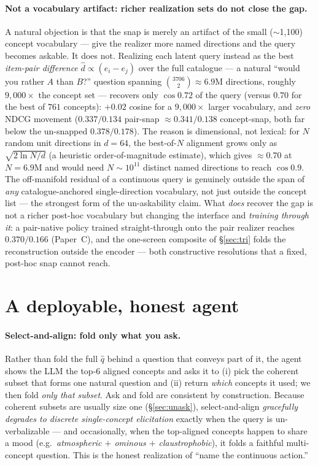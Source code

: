 \documentclass[11pt]{article}
\newcommand{\qhat}{\hat q}
\begin{document}
\paragraph{Not a vocabulary artifact: richer realization sets do not close the gap.} A natural objection is that the
snap is merely an artifact of the small ($\sim$1{,}100) concept vocabulary --- give the realizer more named directions
and the query becomes askable. It does not. Realizing each latent query instead as the best \emph{item-pair difference}
$\hat d\propto(e_i-e_j)$ over the full catalogue --- a natural ``would you rather $A$ than $B$?'' question spanning
$\binom{3706}{2}\approx 6.9\text{M}$ directions, roughly $9{,}000\times$ the concept set --- recovers only $\cos 0.72$
of the query (versus $0.70$ for the best of $761$ concepts): $+0.02$ cosine for a $9{,}000\times$ larger vocabulary, and
\emph{zero} NDCG movement ($0.337/0.134$ pair-snap $\approx 0.341/0.138$ concept-snap, both far below the un-snapped
$0.378/0.178$). The reason is dimensional, not lexical: for $N$ random unit directions in $d{=}64$, the best-of-$N$
alignment grows only as $\sqrt{2\ln N/d}$ (a heuristic order-of-magnitude estimate), which gives $\approx 0.70$ at
$N{=}6.9$M and would need $N\sim 10^{11}$ distinct named directions to reach $\cos 0.9$. The off-manifold residual of a
continuous query is genuinely outside the span of \emph{any} catalogue-anchored single-direction vocabulary, not just
outside the concept list --- the strongest form of the un-askability claim. What \emph{does} recover the gap is not a
richer post-hoc vocabulary but changing the interface and \emph{training through it}: a pair-native policy trained
straight-through onto the pair realizer reaches $0.370/0.166$ (Paper~C), and the one-screen composite of \S\ref{sec:tri}
folds the reconstruction outside the encoder --- both constructive resolutions that a fixed, post-hoc snap cannot reach.

\section{A deployable, honest agent}\label{sec:agent}
\paragraph{Select-and-align: fold only what you ask.} Rather than fold the full $\qhat$ behind a question that conveys
part of it, the agent shows the LLM the top-6 aligned concepts and asks it to (i) pick the coherent subset that forms
one natural question and (ii) return \emph{which} concepts it used; we then fold \emph{only that subset}. Ask and fold
are consistent by construction. Because coherent subsets are usually size one (\S\ref{sec:unask}), select-and-align
\emph{gracefully degrades to discrete single-concept elicitation} exactly when the query is un-verbalizable --- and
occasionally, when the top-aligned concepts happen to share a mood (e.g.\ \emph{atmospheric $+$ ominous $+$
claustrophobic}), it folds a faithful multi-concept question. This is the honest realization of ``name the
continuous action.''
\end{document}
